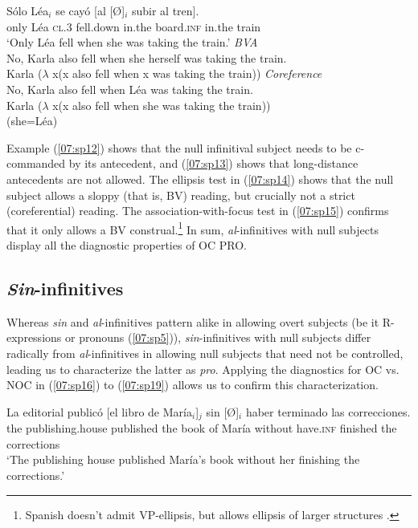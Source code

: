 \documentclass[output=paper,colorlinks,citecolor=brown,draft,draftmode]{langscibook}
\begin{document}
\begin{exe}
\ex\label{07:sp15}
\gll Sólo Léa$_i$ se  cayó  [al [Ø]$_i$ subir      al     tren].\\
only Léa \textsc{cl.3} fell.down in.the {} board.\textsc{inf} in.the train\\
\glt ‘Only Léa fell when she was taking the train.’
\ea \cmark\textit{BVA}  \\
No, Karla also fell when she herself was taking the train.\\
Karla ($\lambda$ x(x also fell when x was taking the train))
\ex \xmark\textit{Coreference}\\
No, Karla also fell when Léa was taking the train. \\
 Karla ($\lambda$ x(x also fell when she was taking the train)) \\
(she=Léa)
\z
\end{exe}

Example (\ref{07:sp12}) shows that the null infinitival subject needs to be c-commanded by its antecedent, and (\ref{07:sp13}) shows that long-distance antecedents are not allowed. The ellipsis test in (\ref{07:sp14}) shows that the null subject allows a sloppy (that is, BV) reading, but crucially not a strict (coreferential) reading. The association-with-focus test in (\ref{07:sp15}) confirms that it only allows a BV construal.\footnote{Spanish doesn’t admit VP-ellipsis, but allows ellipsis of larger structures \citep{dagnac10,  saab10}.}
In sum, \textit{al}-in\-fin\-i\-tives with null subjects display all the diagnostic properties of OC PRO.

\subsection{\textit{Sin}-infinitives}
\label{07:sin-infinitives}
Whereas \textit{sin} and \textit{al}-infinitives pattern alike in allowing overt subjects (be it R-expressions or pronouns (\ref{07:sp5})), \textit{sin}-infinitives with null subjects differ radically from \textit{al}-infinitives in allowing null subjects that need not be controlled, leading us to characterize the latter as \textit{pro}. Applying the diagnostics for OC vs. NOC in (\ref{07:sp16}) to (\ref{07:sp19}) allows us to confirm this characterization.

\begin{exe}
\ex\label{07:sp16}
\gll La editorial publicó [el libro de María$_i$]$_j$  sin [Ø]$_i$ haber terminado las correcciones.\\
the publishing.house published the book of María without {} have.\textsc{inf} finished the corrections \\
\glt ‘The publishing house published María’s book without her finishing the corrections.’
\end{exe}
\end{document}
